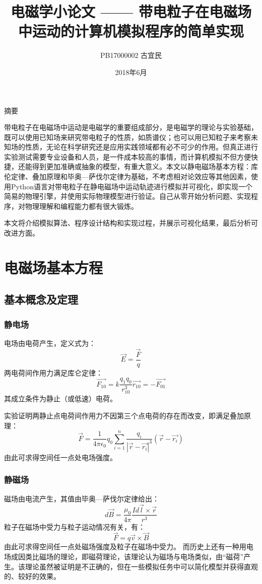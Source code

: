 \documentclass[UTF-8,cs4size]{ctexart}
\title{电磁学小论文 —— 带电粒子在电磁场中运动的计算机模拟程序的简单实现}
\author{PB17000002  古宜民}
\date{2018年6月}
\begin{document}
 \normalsize


\maketitle
\begin{center}
	摘要
\end{center}

带电粒子在电磁场中运动是电磁学的重要组成部分，是电磁学的理论与实验基础，既可以使用已知场来研究带电粒子的性质，如质谱仪；也可以用已知粒子来考察未知场的性质，无论在科学研究还是应用实践领域都有必不可少的作用。但真正进行实验测试需要专业设备和人员，是一件成本较高的事情，而计算机模拟不但方便快捷，还能得到更加准确或抽象的模型，有重大意义。本文以静电磁场基本方程：库伦定律、叠加原理和毕奥—萨伐尔定律为基础，不考虑相对论效应等其他因素，使用Python语言对带电粒子在静电磁场中运动轨迹进行模拟并可视化，即实现一个简易的物理引擎，并使用实际物理模型进行验证。自己从零开始分析问题、实现程序，对物理理解和编程能力都有很大锻炼。


本文将介绍模拟算法、程序设计结构和实现过程，并展示可视化结果，最后分析可改进方面。
\clearpage
\tableofcontents
\clearpage
\section{电磁场基本方程}
\subsection{基本概念及定理}
\subsubsection{静电场}
电场由电荷产生，定义式为：
\begin{equation}
	\vec{E} = \frac{\vec{F}}{q}
\end{equation}
两电荷间作用力满足库仑定律：
\begin{equation}
	\vec{F_{10}} = k\frac{q_1q_0}{r_{10}^3}\vec{r_{10}} = - \vec{F_{01}}
\end{equation}
其成立条件为静止（或低速）电荷。


实验证明两静止点电荷间作用力不因第三个点电荷的存在而改变，即满足叠加原理：
\begin{equation}
	\vec{F} = \frac1{4\pi\epsilon_0}q_0\sum_{i=1}^{n} \frac{q_i}{|\vec{r} - \vec{r_i}|^3}(\vec{r} - \vec{r_i})
\end{equation}
由此可求得空间任一点处电场强度。
\subsubsection{静磁场}
磁场由电流产生，其值由毕奥—萨伐尔定律给出：
\begin{equation}
	d\vec{B} = \frac{\mu_0}{4\pi}\frac{Id\vec{l}\times\vec{r}}{r^3}
\end{equation}
粒子在磁场中受力与粒子运动情况有关，有：
\begin{equation}
	\vec{F} = q\vec{v}\times\vec{B}
\end{equation}
由此可求得空间任一点处磁场强度及粒子在磁场中受力。
而历史上还有一种用电场成因类比磁场的理论，即磁荷理论，该理论认为磁场与电场类似，由“磁荷”产生。该理论虽然被证明是不正确的，但在一些模拟任务中可以简化模型并获得直观的、较好的效果。
\end{document}
